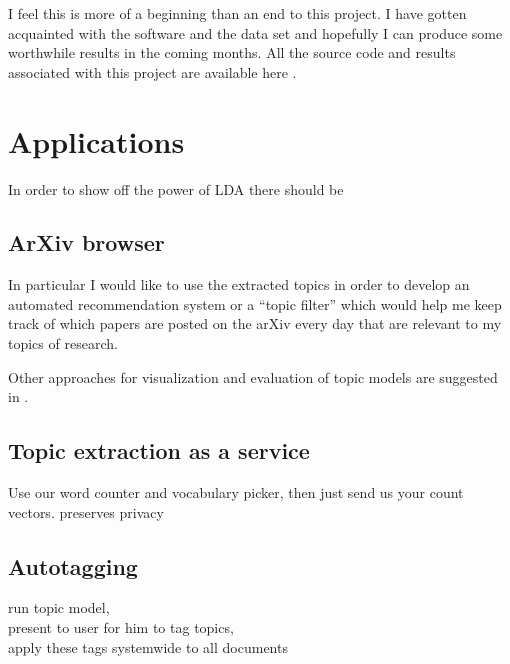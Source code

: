 \documentclass[letterpaper,12pt]{article}
\begin{document}
    I feel this is more of a beginning than an end to this project.
    I have gotten acquainted with the software and the data set and hopefully I can produce
    some worthwhile results in the coming months.
    All the source code and results associated with this project are available here \cite{IvanCode}.


\section{Applications}

	In order to show off the power of LDA there should be
	
	\subsection{ArXiv browser}
	
	    In particular I would like to use the extracted topics in order to develop an automated
	    recommendation system or a ``topic filter'' which would help me keep track of which papers
	    are posted on the arXiv every day that are relevant to my topics of research.

	   Other approaches for visualization and evaluation of topic models are suggested in 
	    \cite{boyd2009reading}. %

		\vspace{3in}	    
	   
	\subsection{Topic extraction as a service}
	
		Use our word counter and vocabulary picker, then just send us your count vectors.
		preserves privacy

		\vspace{3in}

	\subsection{Autotagging}
	
		run topic model, \\
		present to user for him to tag topics, \\
		apply these tags systemwide to all documents

		\vspace{3in}
				
				
	

		

\pagebreak

	



\end{document}

